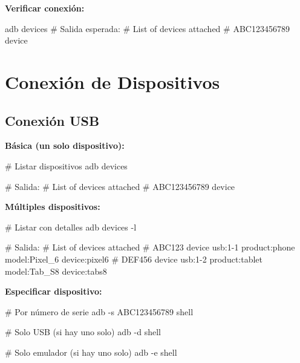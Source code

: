 \documentclass[
  doc,
  floatsintext,
  longtable,
  a4paper,
  nolmodern,
  notxfonts,
  notimes,
  12pt,
  colorlinks=true,linkcolor=blue,citecolor=blue,urlcolor=blue]{apa7}
\newenvironment{Shaded}{\begin{snugshade}}{\end{snugshade}}
\newcommand{\AttributeTok}[1]{\textcolor[rgb]{0.40,0.45,0.13}{#1}}
\newcommand{\CommentTok}[1]{\textcolor[rgb]{0.37,0.37,0.37}{#1}}
\newcommand{\ExtensionTok}[1]{\textcolor[rgb]{0.00,0.23,0.31}{#1}}
\newcommand{\NormalTok}[1]{\textcolor[rgb]{0.00,0.23,0.31}{#1}}
\begin{document}
\textbf{Verificar conexión:}

\begin{Shaded}
\begin{Highlighting}[]
\ExtensionTok{adb}\NormalTok{ devices}
\CommentTok{\# Salida esperada:}
\CommentTok{\# List of devices attached}
\CommentTok{\# ABC123456789    device}
\end{Highlighting}
\end{Shaded}

\section{Conexión de Dispositivos}\label{conexiuxf3n-de-dispositivos}

\subsection{Conexión USB}\label{conexiuxf3n-usb}

\textbf{Básica (un solo dispositivo):}

\begin{Shaded}
\begin{Highlighting}[]
\CommentTok{\# Listar dispositivos}
\ExtensionTok{adb}\NormalTok{ devices}

\CommentTok{\# Salida:}
\CommentTok{\# List of devices attached}
\CommentTok{\# ABC123456789    device}
\end{Highlighting}
\end{Shaded}

\textbf{Múltiples dispositivos:}

\begin{Shaded}
\begin{Highlighting}[]
\CommentTok{\# Listar con detalles}
\ExtensionTok{adb}\NormalTok{ devices }\AttributeTok{{-}l}

\CommentTok{\# Salida:}
\CommentTok{\# List of devices attached}
\CommentTok{\# ABC123    device usb:1{-}1 product:phone model:Pixel\_6 device:pixel6}
\CommentTok{\# DEF456    device usb:1{-}2 product:tablet model:Tab\_S8 device:tabs8}
\end{Highlighting}
\end{Shaded}

\textbf{Especificar dispositivo:}

\begin{Shaded}
\begin{Highlighting}[]
\CommentTok{\# Por número de serie}
\ExtensionTok{adb} \AttributeTok{{-}s}\NormalTok{ ABC123456789 shell}

\CommentTok{\# Solo USB (si hay uno solo)}
\ExtensionTok{adb} \AttributeTok{{-}d}\NormalTok{ shell}

\CommentTok{\# Solo emulador (si hay uno solo)}
\ExtensionTok{adb} \AttributeTok{{-}e}\NormalTok{ shell}
\end{Highlighting}
\end{Shaded}
\end{document}
